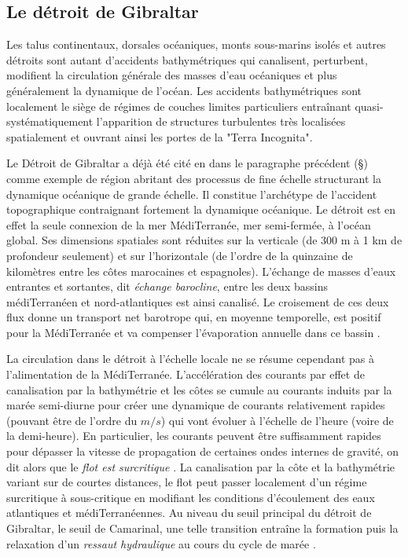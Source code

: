 
\subsection{Le détroit de Gibraltar}
\color{blue}
Les talus continentaux, dorsales océaniques, monts sous-marins isolés et autres détroits sont autant d'accidents bathymétriques qui canalisent, perturbent, modifient la circulation générale des masses d'eau océaniques et plus généralement la dynamique de l'océan. Les accidents bathymétriques sont localement le siège de régimes de couches limites particuliers entraînant quasi-systématiquement l'apparition de structures turbulentes très localisées spatialement et ouvrant ainsi les portes de la "Terra Incognita".

Le Détroit de Gibraltar a déjà été cité en dans le paragraphe précédent (\S {}) comme exemple de région abritant des processus de fine échelle structurant la dynamique océanique de grande échelle. Il constitue l'archétype de l'accident topographique contraignant fortement la dynamique océanique. \color{red}Le détroit est en effet la seule connexion de la mer MédiTerranée, mer semi-fermée, à l'océan global. Ses dimensions spatiales sont réduites sur la verticale (de 300 m à 1 km de profondeur seulement) et sur l'horizontale (de l'ordre de la quinzaine de kilomètres entre les côtes marocaines et espagnoles). L'échange de masses d'eaux entrantes et sortantes, dit \textit{échange barocline}, entre les deux bassins médiTerranéen et nord-atlantiques est ainsi canalisé. Le croisement de ces deux flux donne un transport net barotrope qui, en moyenne temporelle, est positif pour la MédiTerranée et va compenser l'évaporation annuelle dans ce bassin \citep{Bryden94}.

La circulation dans le détroit à l'échelle locale ne se résume cependant pas à l'alimentation de la MédiTerranée. L'accélération des courants par effet de canalisation par la bathymétrie et les côtes se cumule au courants induits par la marée semi-diurne pour créer une dynamique de courants relativement rapides (pouvant être de l'ordre du $m/s$) qui vont évoluer à l'échelle de l'heure (voire de la demi-heure). En particulier, les courants peuvent être suffisamment rapides pour dépasser la vitesse de propagation de certaines ondes internes de gravité, on dit alors que le \textit{flot est surcritique} \citep{Baines1995}. La canalisation par la côte et la bathymétrie variant sur de courtes distances, le flot peut passer localement d'un régime surcritique à sous-critique en modifiant les conditions d'écoulement des eaux atlantiques et médiTerranéennes. Au niveau du seuil principal du détroit de Gibraltar, le seuil de Camarinal, une telle transition entraîne la formation puis la relaxation d'un \textit{ressaut hydraulique} au cours du cycle de marée \citep{FA1988}.

